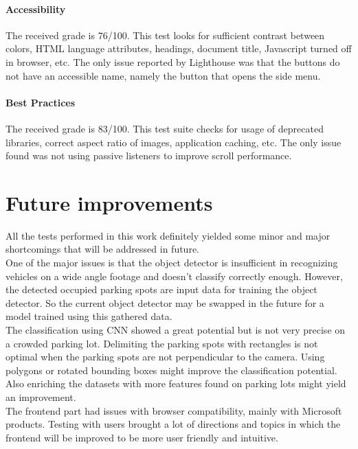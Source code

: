 \documentclass[thesis=M,english]{FITthesis}[2019/03/06]
\begin{document}
\subsubsection{Accessibility}
The received grade is 76/100. This test looks for sufficient contrast between colors, HTML language attributes, headings, document title, Javascript turned off in browser, etc. The only issue reported by Lighthouse was that the buttons do not have an accessible name, namely the button that opens the side menu.

\subsubsection{Best Practices}
The received grade is 83/100. This test suite checks for usage of deprecated libraries, correct aspect ratio of images, application caching, etc. The only issue found was not using passive listeners to improve scroll performance.


\chapter{Future improvements}
All the tests performed in this work definitely yielded some minor and major shortcomings that will be addressed in future. \\

One of the major issues is that the object detector is insufficient in recognizing vehicles on a wide angle footage and doesn't classify correctly enough. However, the detected occupied parking spots are input data for training the object detector. So the current object detector may be swapped in the future for a model trained using this gathered data.  \\

The classification using CNN showed a great potential but is not very precise on a crowded parking lot. Delimiting the parking spots with rectangles is not optimal when the parking spots are not perpendicular to the camera. Using polygons or rotated bounding boxes might improve the classification potential. Also enriching the datasets with more features found on parking lots might yield an improvement.\\

The frontend part had issues with browser compatibility, mainly with Microsoft products. Testing with users brought a lot of directions and topics in which the frontend will be improved to be more user friendly and intuitive. \\
\end{document}
